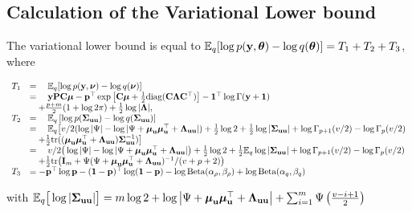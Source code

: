 \documentclass{article}[12pt]
\begin{document}
\subsection{Calculation of the Variational Lower bound}
The variational lower bound is equal to
${\mathbb E}_q[\log{p({\bf y}, {\boldsymbol\theta})} - \log{q({\boldsymbol\theta})}] = T_1 + T_2 + T_3$,
where

$$
\begin{array}{rl}
T_1 &= \quad {\mathbb E}_q[\log{p({\bf y}, {\boldsymbol\nu})} - \log{q({\boldsymbol\nu})}] \\
&= \quad {\bf y} {\bf P} {\bf C} {\boldsymbol\mu} - {\bf p}^\top \exp{\left[ {\bf C}{\boldsymbol\mu}+ {\frac{1}{2}}\text{diag} ({\bf C}{\boldsymbol\Lambda}{\bf C}^\top) \right]} - {\bf 1}^\top\log \Gamma{({\bf y}+ {\bf1})}\\
& \quad + \frac{p + m}{2} (1 + \log{2 \pi}) + {\frac{1}{2}} \log{|{\boldsymbol\Lambda}|}, \\
T_2 &= \quad {\mathbb E}_q \left[ \log p({\boldsymbol \Sigma}_{{\bf u} {\bf u}}) - \log q({\boldsymbol \Sigma}_{{\bf u} {\bf u}}) \right] \\
&= \quad {\mathbb E}_q \big[ v/2(\log |\Psi| - \log |\Psi + {\boldsymbol \mu}_{\bf u} {\boldsymbol \mu}_{\bf u}^\top + {\boldsymbol \Lambda}_{{\bf u} {\bf u}}|) + {\frac{1}{2}} \log 2 + {\frac{1}{2}} \log|{\boldsymbol \Sigma}_{{\bf u} {\bf u}}| + \log \Gamma_{p+1}(v/2) - \log \Gamma_{p}(v/2)\\
&\quad + {\frac{1}{2}} \text{tr}(({\boldsymbol \mu}_{{\bf u}} {\boldsymbol \mu}_{{\bf u}}^\top + {\boldsymbol \Lambda}_{{\bf u} {\bf u}}) {\boldsymbol \Sigma}_{{\bf u} {\bf u}}^{-1}) \big] \\
&= \quad v/2\big(\log |\Psi| - \log |\Psi + {\boldsymbol \mu}_{\bf u} {\boldsymbol \mu}_{\bf u}^\top + {\boldsymbol \Lambda}_{{\bf u} {\bf u}}|\big) + {\frac{1}{2}} \log 2 + {\frac{1}{2}} {\mathbb E}_q \log |{\boldsymbol \Sigma}_{{\bf u} {\bf u}}| + \log \Gamma_{p+1}(v/2) - \log \Gamma_{p}(v/2) \\
&\quad + {\frac{1}{2}} \text{tr}\big({\bf I}_m + \Psi(\Psi+ {\boldsymbol \mu}_{\bf u} {\boldsymbol \mu}_{\bf u}^\top + {\boldsymbol \Lambda}_{{\bf u} {\bf u}})^{-1}/(v + p + 2)\big) \\
T_3 &= - {\bf p}^\top \log {\bf p} - ({\bf 1} - {\bf p})^\top \log ({\bf 1} - {\bf p}) - \log \text{Beta} (\alpha_\rho, \beta_\rho) + \log \text{Beta} (\alpha_q, \beta_q)
\end{array}
$$

with ${\mathbb E}_q \big[ \log |{\boldsymbol \Sigma}_{{\bf u} {\bf u}}| \big] = m \log 2 + \log \left | \Psi + {\boldsymbol \mu}_{\bf u} {\boldsymbol \mu}_{\bf u}^\top + {\boldsymbol \Lambda}_{{\bf u} {\bf u}} \right | + \sum_{i=1}^m \Psi \left ( \frac{v - i + 1}{2} \right )$



\end{document}
